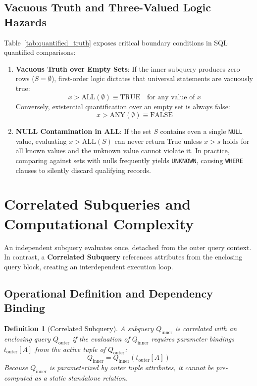 \documentclass[10pt,twocolumn,letterpaper]{article}
\newtheorem{definition}[theorem]{Definition}
\begin{document}
\subsection{Vacuous Truth and Three-Valued Logic Hazards}
Table~\ref{tab:quantified_truth} exposes critical boundary conditions in SQL quantified comparisons:
\begin{enumerate}
    \item \textbf{Vacuous Truth over Empty Sets}: If the inner subquery produces zero rows ($S = \emptyset$), first-order logic dictates that universal statements are vacuously true:
    \begin{equation}
    x > \text{ALL}(\emptyset) \equiv \text{TRUE} \quad \text{for any value of } x
    \end{equation}
    Conversely, existential quantification over an empty set is always false:
    \begin{equation}
    x > \text{ANY}(\emptyset) \equiv \text{FALSE}
    \end{equation}
    \item \textbf{NULL Contamination in ALL}: If the set $S$ contains even a single \texttt{NULL} value, evaluating $x > \text{ALL}(S)$ can never return True unless $x > s$ holds for all known values and the unknown value cannot violate it. In practice, comparing against sets with nulls frequently yields \texttt{UNKNOWN}, causing \texttt{WHERE} clauses to silently discard qualifying records.
\end{enumerate}

\section{Correlated Subqueries and Computational Complexity}
\label{sec:correlated_subqueries}

An independent subquery evaluates once, detached from the outer query context. In contrast, a \textbf{Correlated Subquery} references attributes from the enclosing query block, creating an interdependent execution loop.

\subsection{Operational Definition and Dependency Binding}
\begin{definition}[Correlated Subquery]
A subquery $Q_{\text{inner}}$ is correlated with an enclosing query $Q_{\text{outer}}$ if the evaluation of $Q_{\text{inner}}$ requires parameter bindings $t_{\text{outer}}[A]$ from the active tuple of $Q_{\text{outer}}$:
\begin{equation}
Q_{\text{inner}} = Q_{\text{inner}}(t_{\text{outer}}[A])
\end{equation}
Because $Q_{\text{inner}}$ is parameterized by outer tuple attributes, it cannot be pre-computed as a static standalone relation.
\end{definition}
\end{document}
